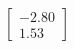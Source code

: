 \documentclass[preview]{standalone}
\begin{document}
\begin{align*}
\begin{bmatrix} -2.80 \\ 1.53 \end{bmatrix}
\end{align*}
\end{document}
